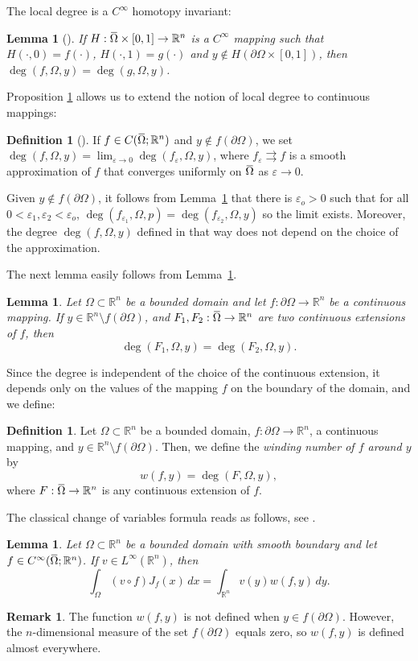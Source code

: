 \documentclass[intlimits,12pt,reqno]{amsart}
\newcommand{\R}{\mathbb R}
\newcommand{\overbar}[1]{\mkern 1.7mu\overline{\mkern-1.7mu#1\mkern-1.5mu}\mkern 1.5mu}
\newcommand{\eps}{\varepsilon}
\numberwithin{equation}{section}
\def\deg{\operatorname{deg}}
\newtheorem{lemma}[theorem]{Lemma}
\theoremstyle{definition}
\newtheorem{remark}[theorem]{Remark}
\newtheorem{definition}[theorem]{Definition}
\begin{document}
The local degree is a $C^\infty$ homotopy invariant:
\begin{lemma}[\mbox{\cite[Theorem 1.12]{FG}}]
\label{thm112}
If $H:\overbar{\Omega}\times[0,1]\to\R^n$ is a $C^\infty$ mapping such that $H(\cdot,0)=f(\cdot)$, $H(\cdot,1)=g(\cdot)$
and $y\not\in H(\partial\Omega\times[0,1])$,
then $\deg(f,\Omega,y)=\deg(g,\Omega,y)$.
\end{lemma}
Proposition \ref{thm112} allows us to extend the notion of local degree to continuous mappings:
\begin{definition}[\mbox{\cite[Definition 1.18]{FG}}]\label{defn118}
If $f\in C(\overbar{\Omega};\R^n)$ and $y\not \in f(\partial\Omega)$, we set  $\deg(f,\Omega,y)=\lim_{\eps\to 0}\deg(f_\eps,\Omega,y)$, where $f_\eps\rightrightarrows f$ is a smooth approximation of $f$ that converges uniformly on $\overbar{\Omega}$ as $\eps\to 0$.
\end{definition}
Given $y\not \in f(\partial\Omega)$,
it follows from Lemma~\ref{thm112} that there is $\eps_o>0$ such that for all $0<\eps_1,\eps_2<\eps_o$,
$\deg(f_{\eps_1},\Omega,p)=\deg(f_{\eps_2},\Omega,y)$ so the limit exists. Moreover, the degree
$\deg(f,\Omega,y)$ defined in that way does not depend on the choice of the approximation.

The next lemma easily follows from Lemma~\ref{thm112}.
\begin{lemma}
Let $\Omega\subset\R^n$ be a bounded domain and let
$f:\partial\Omega\to\R^n$ be a continuous mapping. If $y\in\R^n\setminus f(\partial\Omega)$, and $F_1,F_2:\overbar\Omega\to\R^n$ are two continuous extensions of $f$, then
$$
\deg (F_1,\Omega,y)=\deg(F_2,\Omega,y).
$$
\end{lemma}
Since the degree is independent of the choice of the continuous extension, it depends only on the values of the mapping $f$ on the boundary of the domain, and we define:
\begin{definition}
\label{D5}
Let $\Omega\subset\R^n$ be a bounded domain, $f:\partial\Omega\to\R^n$, a continuous mapping, and $y\in\R^n\setminus f(\partial\Omega)$. Then, we define the {\em winding number of $f$ around $y$} by
$$
w(f,y)=\deg(F,\Omega,y),
$$
where $F:\overbar\Omega\to\R^n$ is any continuous extension of $f$.
\end{definition}


The classical change of variables formula reads as follows, see \cite[Theorem~5.27]{FG}.
\begin{lemma}
\label{T43}
Let $\Omega\subset\R^n$ be a bounded domain with smooth boundary and let $f\in C^\infty(\overbar{\Omega};\R^n)$. If $v\in L^\infty(\R^n)$, then
\begin{equation}
\label{eq405}
\int_{\Omega}(v\circ f)J_f(x)\, dx = \int_{\R^n}v(y)w(f,y)\, dy.
\end{equation}
\end{lemma}
\begin{remark}
The function $w(f,y)$ is not defined when $y\in f(\partial\Omega)$. However, the $n$-dimensional measure of the set $f(\partial\Omega)$ equals zero, so $w(f,y)$ is defined almost everywhere.
\end{remark}
\end{document}
